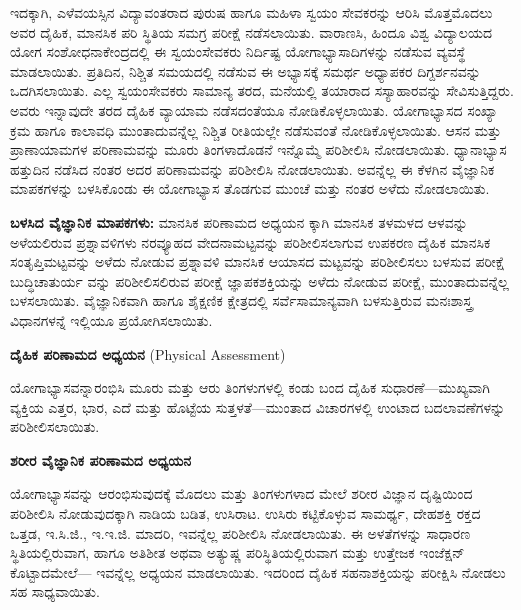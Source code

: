 ಇದಕ್ಕಾಗಿ, ಎಳೆವಯಸ್ಸಿನ ವಿದ್ಯಾವಂತರಾದ ಪುರುಷ ಹಾಗೂ ಮಹಿಳಾ ಸ್ವಯಂ ಸೇವಕರನ್ನು ಆರಿಸಿ ಮೊತ್ತಮೊದಲು ಅವರ ದೈಹಿಕ, ಮಾನಸಿಕ ಪರಿ ಸ್ಥಿತಿಯ ಸಮಗ್ರ ಪರೀಕ್ಷೆ ನಡೆಸಲಾಯಿತು. ವಾರಾಣಸಿ, ಹಿಂದೂ ವಿಶ್ವ ವಿದ್ಯಾಲಯದ ಯೋಗ ಸಂಶೋಧನಾಕೇಂದ್ರದಲ್ಲಿ ಈ ಸ್ವಯಂಸೇವಕರು ನಿರ್ದಿಷ್ಟ ಯೋಗಾಭ್ಯಾಸಾದಿಗಳನ್ನು ನಡೆಸುವ ವ್ಯವಸ್ಥೆ ಮಾಡಲಾಯಿತು. ಪ್ರತಿದಿನ, ನಿಶ್ಚಿತ ಸಮಯದಲ್ಲಿ ನಡೆಸುವ ಈ ಅಭ್ಯಾಸಕ್ಕೆ ಸಮರ್ಥ ಅಧ್ಯಾಪಕರ ದಿಗ್ದರ್ಶನವನ್ನು ಒದಗಿಸಲಾಯಿತು. ಎಲ್ಲ ಸ್ವಯಂಸೇವಕರು ಸಾಮಾನ್ಯ ತರದ, ಮನೆಯಲ್ಲಿ ತಯಾರಾದ ಸಸ್ಯಾಹಾರವನ್ನು ಸೇವಿಸುತ್ತಿದ್ದರು. ಅವರು ಇನ್ನಾವುದೇ ತರದ ದೈಹಿಕ ವ್ಯಾಯಾಮ ನಡೆಸದಂತೆಯೂ ನೋಡಿಕೊಳ್ಳಲಾಯಿತು. ಯೋಗಾಭ್ಯಾಸದ ಸಂಖ್ಯಾ ಕ್ರಮ ಹಾಗೂ ಕಾಲಾವಧಿ ಮುಂತಾದುವನ್ನೆಲ್ಲ ನಿಶ್ಚಿತ ರೀತಿಯಲ್ಲೇ ನಡೆಸುವಂತೆ ನೋಡಿಕೊಳ್ಳಲಾಯಿತು. ಆಸನ ಮತ್ತು ಪ್ರಾಣಾಯಾಮಗಳ ಪರಿಣಾಮವನ್ನು ಮೂರು ತಿಂಗಳಾದೊಡನೆ ಇನ್ನೊಮ್ಮೆ ಪರಿಶೀಲಿಸಿ ನೋಡಲಾಯಿತು. ಧ್ಯಾನಾಭ್ಯಾಸ ಹತ್ತುದಿನ ನಡೆಸಿದ ನಂತರ ಅದರ ಪರಿಣಾಮವನ್ನು ಪರಿಶೀಲಿಸಿ ನೋಡಲಾಯಿತು. ಅವನ್ನೆಲ್ಲ ಈ ಕೆಳಗಿನ ವೈಜ್ಞಾನಿಕ ಮಾಪಕಗಳನ್ನು  ಬಳಸಿಕೊಂಡು ಈ ಯೋಗಾಭ್ಯಾಸ ತೊಡಗುವ ಮುಂಚೆ ಮತ್ತು ನಂತರ ಅಳೆದು ನೋಡಲಾಯಿತು.

\textbf{ಬಳಸಿದ ವೈಜ್ಞಾನಿಕ ಮಾಪಕಗಳು:} ಮಾನಸಿಕ ಪರಿಣಾಮದ ಅಧ್ಯಯನ ಕ್ಕಾಗಿ  ಮಾನಸಿಕ ತಳಮಳದ ಆಳವನ್ನು ಅಳೆಯಲಿರುವ ಪ್ರಶ್ನಾವಳಿಗಳು  ನರವ್ಯೂಹದ ವೇದನಾಮಟ್ಟವನ್ನು ಪರಿಶೀಲಿಸಲಾಗುವ ಉಪಕರಣ  ದೈಹಿಕ ಮಾನಸಿಕ ಸಂತೃಪ್ತಿಮಟ್ಟವನ್ನು ಅಳೆದು ನೋಡುವ ಪ್ರಶ್ನಾವಳಿ  ಮಾನಸಿಕ ಆಯಾಸದ ಮಟ್ಟವನ್ನು ಪರಿಶೀಲಿಸಲು ಬಳಸುವ ಪರೀಕ್ಷೆ  ಬುದ್ಧಿಚಾತುರ್ಯ ವನ್ನು ಪರಿಶೀಲಿಸಲಿರುವ ಪರೀಕ್ಷೆ  ಜ್ಞಾಪಕಶಕ್ತಿಯನ್ನು ಅಳೆದು ನೋಡುವ ಪರೀಕ್ಷೆ, ಮುಂತಾದುವನ್ನೆಲ್ಲ ಬಳಸಲಾಯಿತು. ವೈಜ್ಞಾನಿಕವಾಗಿ ಹಾಗೂ ಶೈಕ್ಷಣಿಕ ಕ್ಷೇತ್ರದಲ್ಲಿ ಸರ್ವೆಸಾಮಾನ್ಯವಾಗಿ ಬಳಸುತ್ತಿರುವ ಮನಃಶಾಸ್ತ್ರ ವಿಧಾನಗಳನ್ನೆ ಇಲ್ಲಿಯೂ ಪ್ರಯೋಗಿಸಲಾಯಿತು.

\textbf{ದೈಹಿಕ ಪರಿಣಾಮದ ಅಧ್ಯಯನ} (Physical Assessment)

ಯೋಗಾಭ್ಯಾಸವನ್ನಾರಂಭಿಸಿ ಮೂರು ಮತ್ತು ಆರು ತಿಂಗಳುಗಳಲ್ಲಿ ಕಂಡು ಬಂದ ದೈಹಿಕ ಸುಧಾರಣೆ—ಮುಖ್ಯವಾಗಿ ವ್ಯಕ್ತಿಯ ಎತ್ತರ, ಭಾರ, ಎದೆ ಮತ್ತು ಹೊಟ್ಟೆಯ ಸುತ್ತಳತೆ—ಮುಂತಾದ ವಿಚಾರಗಳಲ್ಲಿ ಉಂಟಾದ ಬದಲಾವಣೆಗಳನ್ನು ಪರಿಶೀಲಿಸಲಾಯಿತು.

\textbf{ಶರೀರ ವೈಜ್ಞಾನಿಕ ಪರಿಣಾಮದ ಅಧ್ಯಯನ} 

ಯೋಗಾಭ್ಯಾಸವನ್ನು ಆರಂಭಿಸುವುದಕ್ಕೆ ಮೊದಲು ಮತ್ತು  ತಿಂಗಳುಗಳಾದ ಮೇಲೆ ಶರೀರ ವಿಜ್ಞಾನ ದೃಷ್ಟಿಯಿಂದ ಪರಿಶೀಲಿಸಿ ನೋಡುವುದಕ್ಕಾಗಿ ನಾಡಿಯ ಬಡಿತ, ಉಸಿರಾಟ. ಉಸಿರು ಕಟ್ಟಿಕೊಳ್ಳುವ ಸಾಮರ್ಥ್ಯ, ದೇಹಶಕ್ತಿ ರಕ್ತದ ಒತ್ತಡ, ಇ.ಸಿ.ಜಿ., ಇ.ಇ.ಜಿ. ಮಾದರಿ, ಇವನ್ನೆಲ್ಲ ಪರಿಶೀಲಿಸಿ ನೋಡಲಾಯಿತು. ಈ ಅಳತೆಗಳನ್ನು ಸಾಧಾರಣ ಸ್ಥಿತಿಯಲ್ಲಿರುವಾಗ, ಹಾಗೂ ಅತಿಶೀತ ಅಥವಾ ಅತ್ಯುಷ್ಣ ಪರಿಸ್ಥಿತಿಯಲ್ಲಿರುವಾಗ ಮತ್ತು ಉತ್ತೇಜಕ ಇಂಜೆಕ್ಷನ್ ಕೊಟ್ಟಾದಮೇಲೆ— ಇವನ್ನೆಲ್ಲ ಅಧ್ಯಯನ ಮಾಡಲಾಯಿತು. ಇದರಿಂದ ದೈಹಿಕ ಸಹನಾಶಕ್ತಿಯನ್ನು ಪರೀಕ್ಷಿಸಿ ನೋಡಲು ಸಹ ಸಾಧ್ಯವಾಯಿತು.

\begin{center}
\end{center}


